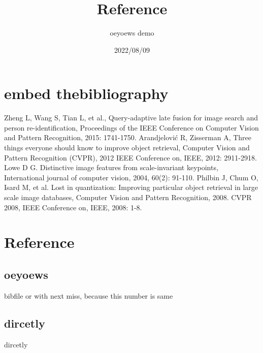 \documentclass{article}
\title{Reference}
\author{oeyoews demo}
\date{2022/08/09}
\begin{document}
\maketitle

\section{embed thebibliography}%
\label{sec:embed thebibliography}

\begin{thebibliography}{99}
Zheng L, Wang S, Tian L, et al., Query-adaptive late fusion for image search and person re-identification, Proceedings of the IEEE Conference on Computer Vision and Pattern Recognition, 2015: 1741-1750.
Arandjelović R, Zisserman A, Three things everyone should know to improve object retrieval, Computer Vision and Pattern Recognition (CVPR), 2012 IEEE Conference on, IEEE, 2012: 2911-2918.
Lowe D G. Distinctive image features from scale-invariant keypoints, International journal of computer vision, 2004, 60(2): 91-110.
Philbin J, Chum O, Isard M, et al. Lost in quantization: Improving particular object retrieval in large scale image databases, Computer Vision and Pattern Recognition, 2008. CVPR 2008, IEEE Conference on, IEEE, 2008: 1-8.
\end{thebibliography}

\section{Reference}




\subsection{oeyoews}%

bibfile or with next miss, because this number is same
\cite{oeyoews}

\subsection{dircetly}%
\label{sub:dircetly}

dircetly
\cite{ref1}
\end{document}
